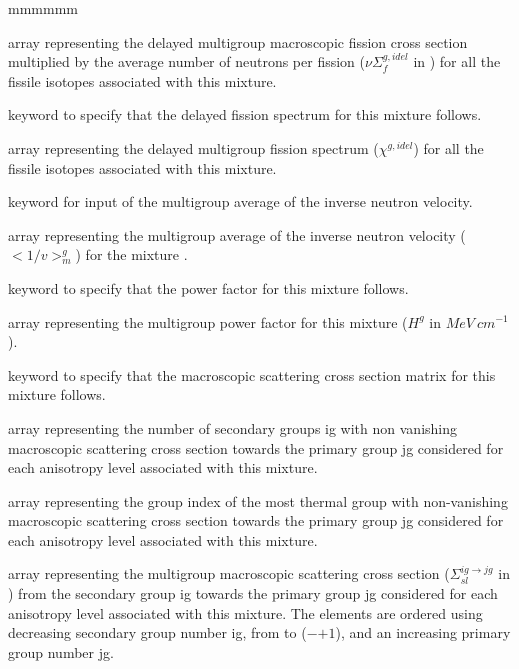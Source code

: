 \begin{ListeDeDescription}{mmmmmm}
\item[\dusa{xssigd}] array representing the delayed multigroup macroscopic fission
cross section multiplied by the average number
of neutrons per fission ($\nu\Sigma_{f}^{g,idel}$ in \xsunit) for all the fissile
isotopes associated with this mixture. 

\item[\moc{CHDL}] keyword to specify that the delayed fission spectrum for this mixture
follows.

\item[\dusa{xschid}] array representing the delayed multigroup fission spectrum
($\chi^{g,idel}$) for all the fissile isotopes associated with this mixture.

\item[\moc{OVERV}] keyword for input of the multigroup average of the inverse neutron velocity.

\item[\dusa{overv}] array representing the multigroup average of the inverse neutron velocity ($<1/v>_{m}^g$) for the mixture 
. 

\item[\moc{H-FACTOR}] keyword to specify that the power factor for
this mixture follows.

\item[\dusa{hfact}] array representing the multigroup power factor for this
mixture ($H^{g}$ in $MeV~cm^{-1}$). 

\item[\moc{SCAT}] keyword to specify that the macroscopic scattering cross
section matrix for this mixture follows.

\item[\dusa{nbscat}] array representing the number of secondary groups ig with
non vanishing macroscopic scattering cross section towards the primary group jg
considered for each anisotropy level associated with this mixture.

\item[\dusa{ilastg}] array representing the group index of the most thermal
group with non-vanishing macroscopic scattering cross section towards the
primary group jg considered for each anisotropy level associated with this
mixture.

\item[\dusa{xsscat}] array representing the multigroup macroscopic scattering
cross section ($\Sigma_{sl}^{ig\to jg}$ in \xsunit) from the secondary group ig
towards the primary group jg considered for each anisotropy level associated
with this mixture. The elements are ordered using decreasing secondary group
number ig, from  to ($-$$+1$), and an
increasing primary group number jg.

\end{ListeDeDescription}

